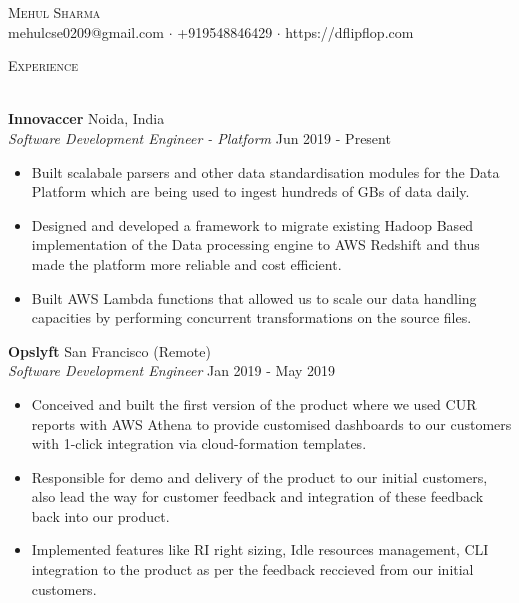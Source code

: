 \documentclass[a4paper]{article}
\newcommand{\lineunder} {
    \vspace*{-8pt} \\
    \hspace*{-18pt} \hrulefill \\
}
\newcommand{\header} [1] {
    {\hspace*{-18pt}\vspace*{6pt} \textsc{#1}}
    \vspace*{-6pt} \lineunder
}
\begin{document}
\vspace*{-40pt}

    

\vspace*{-10pt}
\begin{center}
	{\Huge \scshape {Mehul Sharma}}\\
	mehulcse0209@gmail.com $\cdot$ +919548846429 $\cdot$ https://dflipflop.com\\
\end{center}

\header{Experience}
\vspace{1mm}

\textbf{Innovaccer} \hfill Noida, India\\
\textit{Software Development Engineer - Platform} \hfill Jun 2019 - Present\\
\vspace{-1mm}
\begin{itemize} \itemsep 0.5pt
	\item Built scalabale parsers and other data standardisation modules for the Data Platform which are being used to ingest hundreds of GBs of data daily.
	\item Designed and developed a framework to migrate existing Hadoop Based implementation of the Data processing engine to AWS Redshift and thus made the platform more reliable and cost efficient.  
	\item Built AWS Lambda functions that allowed us to scale our data handling capacities by performing concurrent transformations on the source files.
\end{itemize}
\textbf{Opslyft} \hfill San Francisco (Remote)\\
\textit{Software Development Engineer} \hfill Jan 2019 - May 2019\\
\vspace{-1mm}
\begin{itemize} \itemsep 0.5pt
	\item Conceived and built the first version of the product where we used CUR reports with AWS Athena to provide customised dashboards to our customers with 1-click integration via cloud-formation templates. 
	\item Responsible for demo and delivery of the product to our initial customers, also lead the way for customer feedback and integration of these feedback back into our product. 
	\item Implemented features like RI right sizing, Idle resources management, CLI integration to the product as per the feedback reccieved from our initial customers.
\end{itemize}
\end{document}
